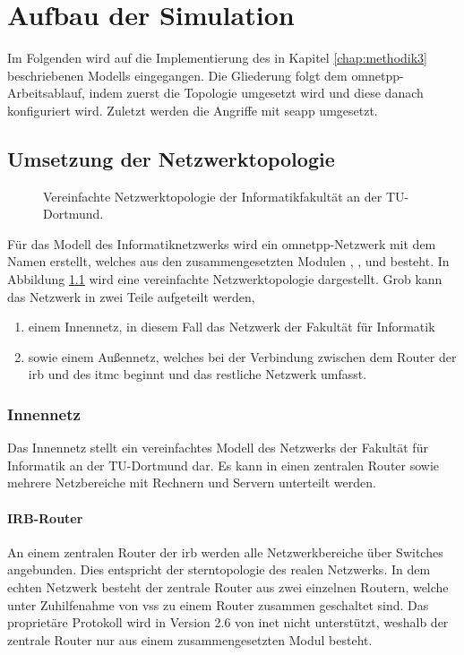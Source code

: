 \chapter{Aufbau der Simulation}\label{chap:sim4}
Im Folgenden wird auf die Implementierung des in Kapitel \ref{chap:methodik3} beschriebenen Modells eingegangen. Die Gliederung folgt dem \gls{omnetpp}-Arbeitsablauf, indem zuerst die Topologie umgesetzt wird und diese danach konfiguriert wird. Zuletzt werden die Angriffe mit \gls{seapp} umgesetzt.

\section{Umsetzung der Netzwerktopologie}
\begin{figure}[ht]
	\centering
	
	\caption[Modelltopologie]{Vereinfachte Netzwerktopologie der Informatikfakultät an der TU-Dortmund.}
	\label{fig:tucsnetOverview}
\end{figure}

Für das Modell des Informatiknetzwerks wird ein \gls{omnetpp}-Netzwerk mit dem Namen  erstellt, welches aus den zusammengesetzten Modulen , ,  und  besteht. In Abbildung \ref{fig:tucsnetOverview} wird eine vereinfachte Netzwerktopologie dargestellt. Grob kann das Netzwerk in zwei Teile aufgeteilt werden,
\begin{enumerate}
	\item einem Innennetz, in diesem Fall das Netzwerk der Fakultät für Informatik
	\item sowie einem Außennetz, welches bei der Verbindung zwischen dem Router der \gls{irb} und des \gls{itmc} beginnt und das restliche Netzwerk umfasst.
\end{enumerate}

\subsection{Innennetz}
Das Innennetz stellt ein vereinfachtes Modell des Netzwerks der Fakultät für Informatik an der TU-Dortmund dar. Es kann in einen zentralen Router sowie mehrere Netzbereiche mit Rechnern und Servern unterteilt werden.

\subsubsection{IRB-Router}
An einem zentralen Router der \gls{irb} werden alle Netzwerkbereiche über Switches angebunden. Dies entspricht der \gls{sterntopologie} des realen Netzwerks. In dem echten Netzwerk besteht der zentrale Router aus zwei einzelnen Routern, welche unter Zuhilfenahme von \gls{vss} zu einem Router zusammen geschaltet sind. Das proprietäre Protokoll wird in Version 2.6 von \gls{inet} nicht unterstützt, weshalb der zentrale Router nur aus einem zusammengesetzten Modul  besteht. 

